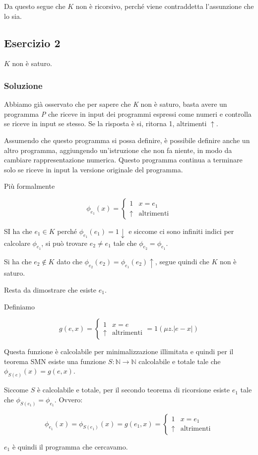 Da questo segue che $K$ non è ricorsivo, perché viene contraddetta l'assunzione che lo sia.

\subsection{Esercizio 2}

$K$ non è saturo.

\subsubsection{Soluzione}

Abbiamo già osservato che per sapere che \textit{K} non è saturo, basta avere un programma \textit{P} che riceve in input dei programmi espressi come numeri e controlla se riceve in input se stesso. Se la risposta è si, ritorna 1, altrimenti $\uparrow$.

Assumendo che questo programma si possa definire, è possibile definire anche un altro programma, aggiungendo un'istruzione che non fa niente, in modo da cambiare rappresentazione numerica. Questo programma continua a terminare solo se riceve in input la versione originale del programma.

Più formalmente

$$
\phi_{e_1}(x) = \begin{cases}
1 &x = e_1 \\
\uparrow &\text{altrimenti} 
\end{cases}
$$

SI ha che $e_1 \in K$ perché $\phi_{e_1}(e_1) = 1 \downarrow$ e siccome ci sono infiniti indici per calcolare $\phi_{e_1}$, si può trovare $e_2 \neq e_1$ tale che $\phi_{e_2} = \phi_{e_1}$.

Si ha che $e_2 \notin K$ dato che $\phi_{e_2}(e_2) = \phi_{e_1}(e_2) \uparrow$, segue quindi che $K$ non è saturo.

Resta da dimostrare che esiste $e_1$.

Definiamo

$$
g(e,x) = \begin{cases}
1 &x = e \\
\uparrow &\text{altrimenti}
\end{cases} = 1(\mu z. |e-x|)
$$

Questa funzione è calcolabile per minimalizzazione illimitata e quindi per il teorema SMN  esiste una funzione $S : \mathbb{N} \rightarrow \mathbb{N}$ calcolabile e totale tale che $\phi_{S(e)}(x) = g(e,x)$.

Siccome $S$ è calcolabile e totale, per il secondo teorema di ricorsione esiste $e_1$ tale che $\phi_{S(e_1)} = \phi_{e_1}$.
Ovvero:

$$\phi_{e_1}(x) = \phi_{S(e_1)}(x) = g(e_1, x) = \begin{cases}
1 &x = e_1 \\
\uparrow &\text{altrimenti}
\end{cases}$$

$e_1$ è quindi il programma che cercavamo.
